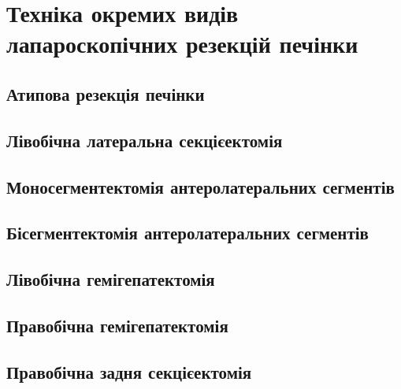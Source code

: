 \chapter{Техніка окремих видів лапароскопічних резекцій печінки} 

\begin{refsection}

\section{Атипова резекція печінки}

\section{Лівобічна латеральна секцієектомія}

\section{Моносегментектомія антеролатеральних сегментів}

\section{Бісегментектомія антеролатеральних сегментів}

\section{Лівобічна гемігепатектомія}

\section{Правобічна гемігепатектомія}

\section{Правобічна задня секцієектомія}

\printbibliography [heading=subbibliography]
\end{refsection}